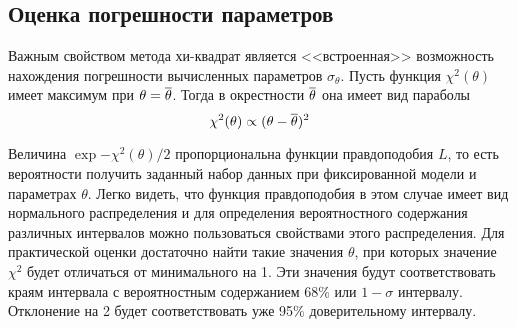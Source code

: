 \subsection{Оценка погрешности параметров}

Важным свойством метода хи-квадрат является <<встроенная>> возможность
нахождения погрешности вычисленных параметров $\sigma_{\theta}$.
Пусть функция $\chi^2(\theta)$ имеет максимум при
$\theta = \overline{\theta}$. Тогда в окрестности $\overline{\theta}$ она
имеет вид параболы
\[
\chi^2(\theta) \propto (\theta - \overline{\theta})^2
\]

Величина $\exp{- \chi^2(\theta)/2}$ пропорциональна функции правдоподобия $L$,
то есть вероятности получить заданный набор данных при фиксированной
модели и параметрах $\theta$. Легко видеть, что функция правдоподобия
в этом случае имеет вид нормального распределения и для
определения вероятностного содержания различных интервалов можно пользоваться
свойствами этого распределения. Для практической оценки достаточно найти такие
значения $\theta$, при которых значение $\chi^2$ будет отличаться от
минимального на 1. Эти значения будут соответствовать краям интервала с
вероятностным содержанием 68\% или $1-\sigma$ интервалу. Отклонение на 2 будет
соответствовать уже 95\% доверительному интервалу.





